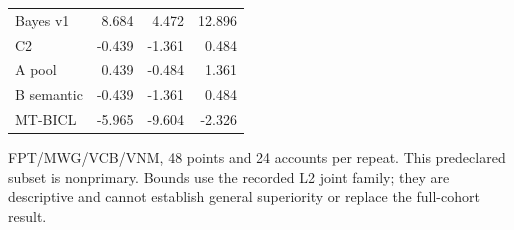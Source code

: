 \begin{table}[p]
\begin{tabular}{lrrr}
\hline
Bayes v1 & 8.684 & 4.472 & 12.896 \\
C2 & -0.439 & -1.361 & 0.484 \\
A pool & 0.439 & -0.484 & 1.361 \\
B semantic & -0.439 & -1.361 & 0.484 \\
MT-BICL & -5.965 & -9.604 & -2.326 \\
\hline
\end{tabular}\par\medskip
\begin{minipage}{\textwidth}\footnotesize FPT/MWG/VCB/VNM, 48 points and 24 accounts per repeat. This predeclared subset is nonprimary. Bounds use the recorded L2 joint family; they are descriptive and cannot establish general superiority or replace the full-cohort result.\end{minipage}
\end{table}
